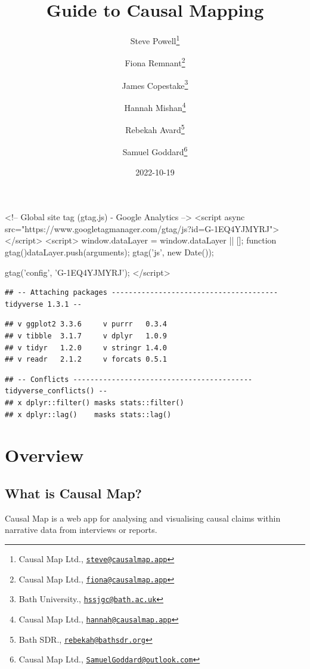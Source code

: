 \documentclass[
]{book}
\title{Guide to Causal Mapping}
\author{Steve Powell\footnote{Causal Map Ltd., \href{mailto:steve@causalmap.app}{\nolinkurl{steve@causalmap.app}}} \and Fiona Remnant\footnote{Causal Map Ltd., \href{mailto:fiona@causalmap.app}{\nolinkurl{fiona@causalmap.app}}} \and James Copestake\footnote{Bath University., \href{mailto:hssjgc@bath.ac.uk}{\nolinkurl{hssjgc@bath.ac.uk}}} \and Hannah Mishan\footnote{Causal Map Ltd., \href{mailto:hannah@causalmap.app}{\nolinkurl{hannah@causalmap.app}}} \and Rebekah Avard\footnote{Bath SDR., \href{mailto:rebekah@bathsdr.org}{\nolinkurl{rebekah@bathsdr.org}}} \and Samuel Goddard\footnote{Causal Map Ltd., \href{mailto:SamuelGoddard@outlook.com}{\nolinkurl{SamuelGoddard@outlook.com}}}}
\date{2022-10-19}
\newenvironment{Shaded}{\begin{snugshade}}{\end{snugshade}}
\newcommand{\AttributeTok}[1]{\textcolor[rgb]{0.77,0.63,0.00}{#1}}
\newcommand{\FunctionTok}[1]{\textcolor[rgb]{0.00,0.00,0.00}{#1}}
\newcommand{\NormalTok}[1]{#1}
\newcommand{\SpecialCharTok}[1]{\textcolor[rgb]{0.00,0.00,0.00}{#1}}
\begin{document}
\maketitle

<!-- Global site tag (gtag.js) - Google Analytics -->
<script async src="https://www.googletagmanager.com/gtag/js?id=G-1EQ4YJMYRJ"></script>
<script>
  window.dataLayer = window.dataLayer || [];
  function gtag(){dataLayer.push(arguments);}
  gtag('js', new Date());

  gtag('config', 'G-1EQ4YJMYRJ');
</script>

{
\setcounter{tocdepth}{1}
\tableofcontents
}
\begin{Shaded}
\end{Shaded}

\begin{verbatim}
## -- Attaching packages --------------------------------------- tidyverse 1.3.1 --
\end{verbatim}

\begin{verbatim}
## v ggplot2 3.3.6     v purrr   0.3.4
## v tibble  3.1.7     v dplyr   1.0.9
## v tidyr   1.2.0     v stringr 1.4.0
## v readr   2.1.2     v forcats 0.5.1
\end{verbatim}

\begin{verbatim}
## -- Conflicts ------------------------------------------ tidyverse_conflicts() --
## x dplyr::filter() masks stats::filter()
## x dplyr::lag()    masks stats::lag()
\end{verbatim}

\hypertarget{overview}{%
\chapter{Overview}\label{overview}}

\hypertarget{what-is-causal-map}{%
\section{What is Causal Map?}\label{what-is-causal-map}}

Causal Map is a web app for analysing and visualising causal claims within narrative data from interviews or reports.
\end{document}
